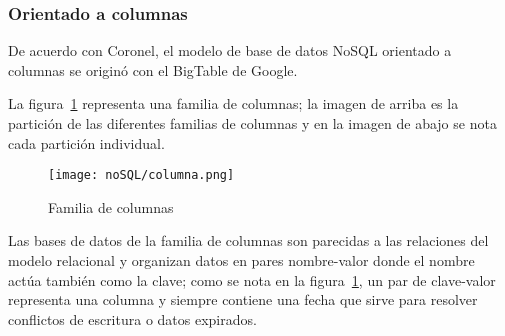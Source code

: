 \subsubsection{Orientado a columnas}
De acuerdo con Coronel\cite{coronel_database_nodate}, el modelo de base de datos NoSQL orientado a columnas se originó con el BigTable de Google. 


La figura~\ref{img:familia-columna} representa una familia de columnas; la imagen de arriba es la partición de las diferentes familias de columnas y en la imagen de abajo se nota cada partición individual.


\begin{figure}[H] 
    \centering
    \texttt{[image: noSQL/columna.png]}
    \caption{Familia de columnas}
    \label{img:familia-columna}
\end{figure}


Las bases de datos de la familia de columnas son parecidas a las relaciones del modelo relacional y organizan datos en pares nombre-valor donde el nombre actúa también como la clave; como se nota en la figura~\ref{img:familia-columna}, un par de clave-valor representa una columna y siempre contiene una fecha que sirve para resolver conflictos de escritura o datos expirados.
